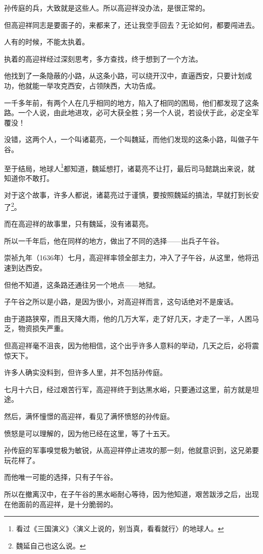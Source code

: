 \begin{multicols}{\theparacolNo}
		孙传庭的兵，大致就是这些人。所以高迎祥没办法，是很正常的。

		但高迎祥同志是要面子的，来都来了，还让我空手回去？无论如何，都要闯进去。

		人有的时候，不能太执着。

		执着的高迎祥经过深刻思考，多方查找，终于想到了一个方法。

		他找到了一条隐蔽的小路，从这条小路，可以绕开汉中，直逼西安，只要计划成功，他就能一举攻克西安，占领陕西，大功告成。

		一千多年前，有两个人在几乎相同的地方，陷入了相同的困局，他们都发现了这条路。一个人说，由此地进攻，必可大获全胜；另一个人说，若设伏于此，必定全军覆没！

		没错，这两个人，一个叫诸葛亮，一个叫魏延，而他们发现的这条小路，叫做子午谷。

		至于结局，地球人\footnote{看过《三国演义》〈演义上说的，别当真，看看就行〉的地球人。}都知道，魏延想打，诸葛亮不让打，最后司马懿跳出来说，就知道你不敢打。

		对于这个故事，许多人都说，诸葛亮过于谨慎，要按照魏延的搞法，早就打到长安了\footnote{魏延自己也这么说。}。

		而在高迎祥的故事里，只有魏延，没有诸葛亮。

		所以一千年后，他在同样的地方，做出了不同的选择——出兵子午谷。

		崇祯九年（1636年）七月，高迎祥率领全部主力，冲入了子午谷，从这里，他将迅速到达西安。

		但他不知道，这条路还通往另一个地点——地狱。

		子午谷之所以是小路，是因为很小，对高迎祥而言，这句话绝对不是废话。

		由于道路狭窄，而且天降大雨，他的几万大军，走了好几天，才走了一半，人困马乏，物资损失严重。

		但高迎祥毫不沮丧，因为他相信，这个出乎许多人意料的举动，几天之后，必将震惊天下。

		许多人确实没料到，但许多人里，并不包括孙传庭。

		七月十六日，经过艰苦行军，高迎祥终于到达黑水峪，只要通过这里，前方就是坦途。

		然后，满怀憧憬的高迎祥，看见了满怀愤怒的孙传庭。

		愤怒是可以理解的，因为他已经在这里，等了十五天。

		孙传庭的军事嗅觉极为敏锐，从高迎祥停止进攻的那一刻，他就意识到，这兄弟要玩花样了。

		而他唯一可能的选择，只有子午谷。

		所以在撤离汉中，在子午谷的黑水峪耐心等待，因为他知道，艰苦跋涉之后，出现在他面前的高迎祥，是十分脆弱的。


\end{multicols}
